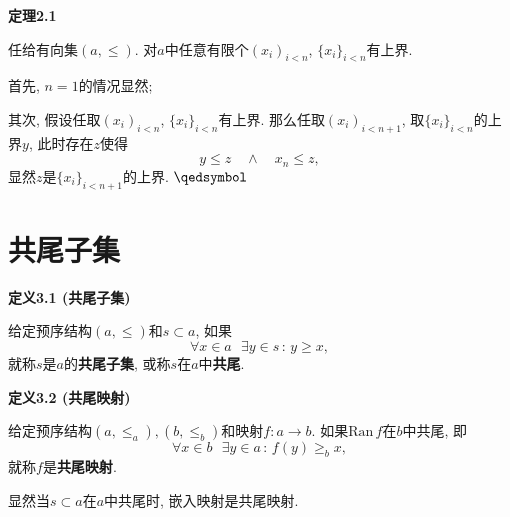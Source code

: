 \vspace{10pt}

\hypertarget{sec:定理2.1}{}
\noindent\textbf{定理2.1}

任给有向集$(a,\leqslant)$. 对$a$中任意有限个$(x_i)_{i<n}$,
$\{x_i\}_{i<n}$有上界.


首先, $n=1$的情况显然;

其次, 假设任取$(x_i)_{i<n}$, $\{x_i\}_{i<n}$有上界. 那么任取$(x_i)_{i<n+1}$,
取$\{x_i\}_{i<n}$的上界$y$, 此时存在$z$使得
\[
    y\leqslant z\quad\land\quad x_n\leqslant z,
\]
显然$z$是$\{x_i\}_{i<n+1}$的上界. \hfill $\qedsymbol$





\vspace{20pt}

\section{共尾子集}

\hypertarget{sec:定义3.1}{}
\noindent\textbf{定义3.1 (共尾子集)}

给定预序结构$(a,\leqslant)$和$s\subset a$, 如果
\[
    \forall x\in a\,\,\,\,\exists y\in s\,:\,y\geqslant x,
\]
就称$s$是$a$的\textbf{共尾子集}, 或称$s$在$a$中\textbf{共尾}.

\vspace{10pt}

\hypertarget{sec:定义3.2}{}
\noindent\textbf{定义3.2 (共尾映射)}

给定预序结构$(a,\leqslant_a),(b,\leqslant_b)$和映射$f:a\to b$.
如果$\mathrm{Ran}\,f$在$b$中共尾, 即
\[
    \forall x\in b\,\,\,\,\exists y\in a\,:\,f(y)\geqslant_b x,
\]
就称$f$是\textbf{共尾映射}.

\vspace{10pt}

显然当$s\subset a$在$a$中共尾时, 嵌入映射是共尾映射.


